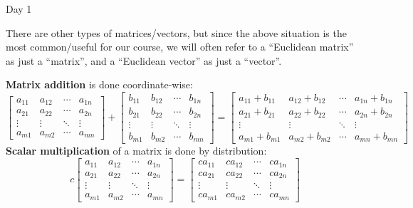 \begin{applicationActivities}{Day 1}
\begin{remark}
  There are other types of matrices/vectors, but since the above situation is
  the most common/useful for our course, we will often refer to a
  ``Euclidean matrix'' as just a ``matrix'', and a ``Euclidean vector'' as
  just a ``vector''.
\end{remark}

\begin{definition}
  \textbf{Matrix addition} is done coordinate-wise:
  \[
  \begin{bmatrix}
    a_{11} & a_{12} & \cdots & a_{1n} \\
    a_{21} & a_{22} & \cdots & a_{2n} \\
    \vdots & \vdots & \ddots & \vdots \\
    a_{m1} & a_{m2} & \cdots & a_{mn}
  \end{bmatrix} +
  \begin{bmatrix}
    b_{11} & b_{12} & \cdots & b_{1n} \\
    b_{21} & b_{22} & \cdots & b_{2n} \\
    \vdots & \vdots & \ddots & \vdots \\
    b_{m1} & b_{m2} & \cdots & b_{mn}
  \end{bmatrix} =
  \begin{bmatrix}
    a_{11}+b_{11} & a_{12}+b_{12} & \cdots & a_{1n}+b_{1n} \\
    a_{21}+b_{21} & a_{22}+b_{22} & \cdots & a_{2n}+b_{2n} \\
    \vdots & \vdots & \ddots & \vdots \\
    a_{m1}+b_{m1} & a_{m2}+b_{m2} & \cdots & a_{mn}+b_{mn}
  \end{bmatrix}
  \]
  \textbf{Scalar multiplication} of a matrix is done by distribution:
  \[
  c
  \begin{bmatrix}
    a_{11} & a_{12} & \cdots & a_{1n} \\
    a_{21} & a_{22} & \cdots & a_{2n} \\
    \vdots & \vdots & \ddots & \vdots \\
    a_{m1} & a_{m2} & \cdots & a_{mn}
  \end{bmatrix} =
  \begin{bmatrix}
    ca_{11} & ca_{12} & \cdots & ca_{1n} \\
    ca_{21} & ca_{22} & \cdots & ca_{2n} \\
    \vdots & \vdots & \ddots & \vdots \\
    ca_{m1} & ca_{m2} & \cdots & ca_{mn}
  \end{bmatrix}
  \]
\end{definition}


\end{applicationActivities}
